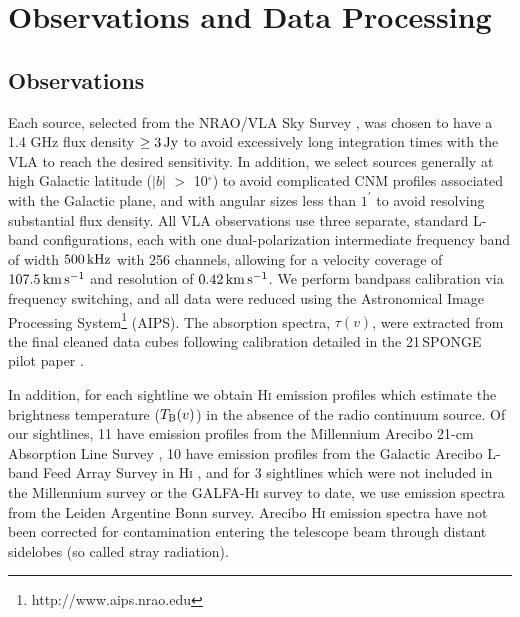 \documentclass{aastex}
\begin{document}
\section{Observations and Data Processing}
\label{s:obs}

\subsection{Observations}

Each source, selected from the NRAO/VLA Sky Survey \citep{NVSS}, 
was chosen to have a 1.4 GHz flux density $\geq 3\,\rm Jy$ to avoid
excessively long integration times with the VLA to reach the 
desired sensitivity.  In addition, we select sources generally 
at high Galactic latitude ($|b|$ $>$ 10$^\circ$) to avoid 
complicated CNM profiles associated with the Galactic plane,
and with angular sizes less than $1^\prime$ to avoid resolving 
substantial flux density.  All VLA observations use three separate, 
standard L-band configurations, each with one dual-polarization 
intermediate frequency band of width $500\,\rm kHz$ with 
256 channels, allowing for a velocity coverage of 
$107.5\,\rm km\,s^{-1}$ and resolution of $0.42\,\rm km\,s^{-1}$. 
We perform bandpass calibration via frequency switching, 
and all data were reduced using the Astronomical Image Processing
System\footnote{http://www.aips.nrao.edu} (AIPS).
The absorption spectra, $\tau(v)$, were extracted from the final cleaned data cubes
following calibration detailed in the 21\,SPONGE pilot paper \citep{Begum}.

In addition, for each sightline we obtain H\textsc{i} 
emission profiles which estimate the brightness 
temperature ($T_{\rm B}(v)$) in the absence of the radio 
continuum source.  Of our \NoOfSources{} sightlines, 11 
have emission profiles from the Millennium Arecibo 21-cm 
Absorption Line Survey \citep{HT031}, 10 have emission 
profiles from the Galactic Arecibo L-band Feed 
Array Survey in H\textsc{i} \citep[GALFA--H\textsc{i}; ][]{Stanimirovic06, GALFA}, 
and for 3 sightlines which were not included
in the Millennium survey or the GALFA-H\textsc{i} survey 
to date, we use emission spectra from the Leiden Argentine 
Bonn \citep[LAB; ][]{LAB} survey. Arecibo H\textsc{i} emission spectra 
have not been corrected for contamination
entering the telescope beam through distant sidelobes (so called stray radiation).
\end{document}

